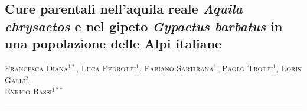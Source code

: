 \setcounter{figure}{0}
\setcounter{table}{0}


\begin{adjustwidth}{-3.5cm}{-1cm}
\pagestyle{CIOpage}
\chapter*[Cure parentali nell{\textquoteright}aquila reale e nel
gipeto]{Cure parentali nell{\textquoteright}aquila reale
\textbf{\textit{Aquila chrysaetos}}\textbf{ e nel gipeto
}\textbf{\textit{Gypaetus barbatus}} \textbf{in una popolazione delle Alpi italiane}}
\end{adjustwidth}
\begin{adjustwidth}{-3.5cm}{0cm}
\textsc{Francesca Diana}$^{1*}$, \textsc{Luca Pedrotti}$^{1}$, 
\textsc{Fabiano Sartirana}$^{1}$, \textsc{Paolo Trotti}$^{1}$,
\textsc{Loris Galli}$^{2}$, \\\textsc{Enrico Bassi}$^{1**}$\\
     
\noindent\color{MUSEBLUE}\rule{27cm}{2pt}
\vspace{1cm}
\end{adjustwidth}



